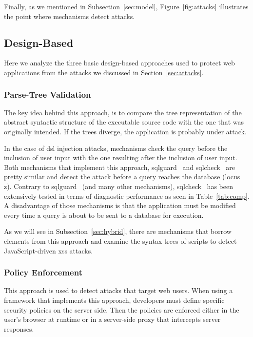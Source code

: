 \documentclass[conference]{IEEEtran}
\begin{document}
Finally, as we mentioned in Subsection~\ref{sec:model},
Figure~\ref{fig:attacks} illustrates the point where
mechanisms detect attacks.

\subsection{Design-Based}
\label{sec:prot}

Here we analyze the three basic design-based approaches
used to protect web applications from the attacks we
discussed in Section~\ref{sec:attacks}.

\subsubsection{Parse-Tree Validation}
\label{sec:tree}

The key idea behind this approach, is to compare
the tree representation of the abstract syntactic
structure of the executable source code
with the one that was originally intended.
If the trees diverge, the application is probably
under attack.

In the case of {\sc dsl} injection attacks, mechanisms check 
the query before the inclusion of user input with the one
resulting after the inclusion of user input.
Both mechanisms that implement this approach,
{\sc sqlg}uard~\cite{BWS05} and
{\sc sql}check~\cite{SW06} are pretty similar
and detect the attack before a query reaches the
database (locus {\sc z}).
Contrary to {\sc sqlg}uard~\cite{BWS05} (and many other
mechanisms), {\sc sql}check~\cite{SW06} has been
extensively tested in terms of diagnostic performance
as seen in Table~\ref{tab:comp}. A disadvantage of
those mechanisms is that the application must be modified
every time a query is about to be sent to a database
for execution.

As we will see in Subsection~\ref{sec:hybrid},
there are mechanisms that borrow elements from
this approach and examine the syntax trees
of scripts to detect JavaScript-driven {\sc xss} attacks.

\subsubsection{Policy Enforcement}
\label{sec:policy}

This approach is used to detect attacks that target web users.
When using a framework that implements
this approach, developers must define
specific security policies on the server side.
Then the policies are enforced either in the user's
browser at runtime or in a server-side proxy that intercepts
server responses.
\end{document}
